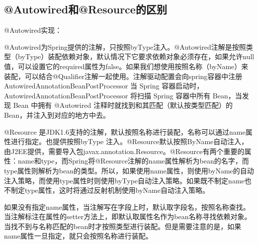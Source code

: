 \documentclass[../../../interview-questions.tex]{subfiles}
\begin{document}
\subsection{@Autowired和@Resource的区别}

@Autowired实现：

@Autowired为Spring提供的注解，只按照byType注入。@Autowired注解是按照类型（byType）装配依赖对象，默认情况下它要求依赖对象必须存在，如果允许null值，可以设置它的required属性为false。如果我们想使用按照名称（byName）来装配，可以结合@Qualifier注解一起使用。注解驱动配置会向spring容器中注册AutowiredAnnotationBeanPostProcessor
当 Spring 容器启动时，AutowiredAnnotationBeanPostProcessor 将扫描 Spring 容器中所有 Bean，当发现 Bean 中拥有 @Autowired 注释时就找到和其匹配（默认按类型匹配）的 Bean，并注入到对应的地方中去。

@Resource 是JDK1.6支持的注解，默认按照名称进行装配，名称可以通过name属性进行指定。也提供按照byType 注入。@Resource默认按照ByName自动注入，由J2EE提供，需要导入包javax.annotation.Resource。@Resource有两个重要的属性：name和type，而Spring将@Resource注解的name属性解析为bean的名字，而type属性则解析为bean的类型。所以，如果使用name属性，则使用byName的自动注入策略，而使用type属性时则使用byType自动注入策略。如果既不制定name也不制定type属性，这时将通过反射机制使用byName自动注入策略。

如果没有指定name属性，当注解写在字段上时，默认取字段名，按照名称查找。
当注解标注在属性的setter方法上，即默认取属性名作为bean名称寻找依赖对象。
当找不到与名称匹配的bean时才按照类型进行装配。但是需要注意的是，如果name属性一旦指定，就只会按照名称进行装配。
\end{document}
